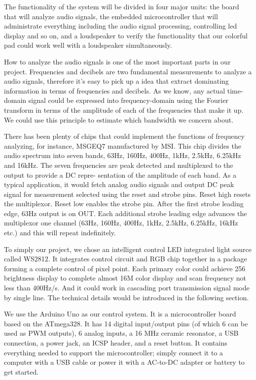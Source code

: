 \documentclass[12pt,a4paper,journal]{IEEEtran}
\begin{document}
The functionality of the system will be divided in four major units: the board that will analyze audio signals, the embedded microcontroller that will administrate everything including the audio signal processing, controlling led display and so on, and a loudspeaker to verify the functionality that our colorful pad could work well with a loudspeaker simultaneously.

How to analyze the audio signals is one of the most important parts in our project. Frequencies and decibels are two fundamental measurements to analyze a audio signals, therefore it's easy to pick up a idea that extract dominating information in terms of frequencies and decibels. As we know, any actual time-domain signal could be expressed into frequency-domain using the Fourier transform in terms of the amplitude of each of the frequencies that make it up. We could use this principle to estimate which bandwidth we concern about.

There has been plenty of chips that could implement the functions of frequency analyzing, for instance, MSGEQ7 manufactured by MSI. This chip divides the audio spectrum into seven bands, 63Hz, 160Hz, 400Hz, 1kHz, 2.5kHz, 6.25kHz and 16kHz. The seven frequencies are peak detected and multiplexed to the output to provide a DC repre- sentation of the amplitude of each band. As a typical application, it would fetch analog audio signals and output DC peak signal for measurement selected using the reset and strobe pins. Reset high resets the multiplexor. Reset low enables the strobe pin. After the first strobe leading edge, 63Hz output is on OUT. Each additional strobe leading edge advances the multiplexor one channel (63Hz, 160Hz, 400Hz, 1kHz, 2.5kHz, 6.25kHz, 16kHz etc.) and this will repeat indefinitely.

To simply our project, we chose an intelligent control LED integrated light source called WS2812. It integrates control circuit and RGB chip together in a package forming a complete control of pixel point. Each primary color could achieve 256 brightness display to complete almost 16M color display and scan frequency not less than 400Hz/s. And it could work in cascading port transmission signal mode by single line. The technical details would be introduced in the following section.

We use the Arduino Uno as our control system. It is a microcontroller board based on the ATmega328. It has 14 digital input/output pins (of which 6 can be used as PWM outputs), 6 analog inputs, a 16 MHz ceramic resonator, a USB connection, a power jack, an ICSP header, and a reset button. It contains everything needed to support the microcontroller; simply connect it to a computer with a USB cable or power it with a AC-to-DC adapter or battery to get started.
\end{document}
